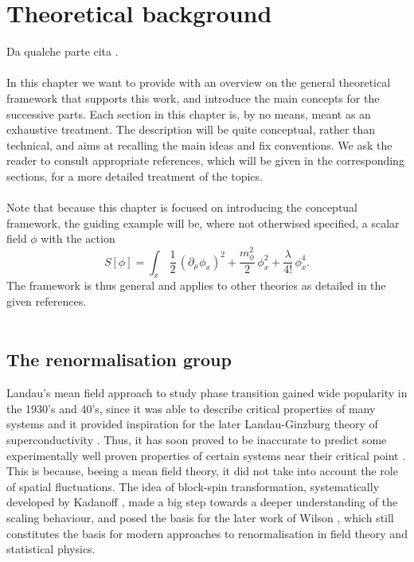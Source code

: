 \chapter{Theoretical background}
\label{chap:background}

Da qualche parte cita \cite{carosso2020novel}. \\~\\
In this chapter we want to provide with an overview on the general theoretical framework that supports this work, and introduce the main concepts for the successive parts. Each section in this chapter is, by no means, meant as an exhaustive treatment. The description will be quite conceptual, rather than technical, and aims at recalling the main ideas and fix conventions. We ask the reader to consult appropriate references,  which will be given in the corresponding sections, for a more detailed treatment of the topics. \\~\\
Note that because this chapter is focused on introducing the conceptual framework, the guiding example will be, where not otherwised specified, a scalar field $\phi$ with the action 
\begin{equation}
    S[\phi] = \int_x \, \frac{1}{2} \, (\partial_\mu \phi_x)^2 + \frac{m_\phi^2}{2} \, \phi_x^2 + \frac{\lambda}{4!} \, \phi_x^4.
    \label{eq:phi4_action}
\end{equation}
The framework is thus general and applies to other theories as detailed in the given references. \\~\\

\section{The renormalisation group}
Landau's mean field approach to study phase transition \cite{Landau:1937obd} gained wide popularity in the 1930's and 40's, since it was able to describe critical properties of many systems and it provided inspiration for the later Landau-Ginzburg theory of superconductivity \cite{ginzburg}. Thus, it has soon proved to be inaccurate to predict some experimentally well proven properties of certain systems near their critical point \cite{Cao:1999pw}. This is because, beeing a mean field theory, it did not take into account the role of spatial fluctuations.
The idea of block-spin transformation, systematically developed by Kadanoff \cite{PhysicsPhysiqueFizika_2_263}, made a big step towards a deeper understanding of the scaling behaviour, and posed the basis for the later work of Wilson \cite{WilsonRG1,WilsonRG2,WilsonFisher}, which still constitutes the basis for modern approaches to renormalisation in field theory and statistical physics.\\~\\

